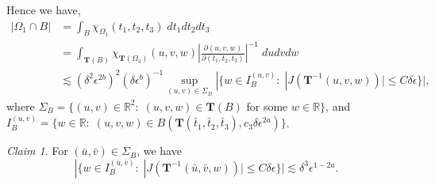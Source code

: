 \documentclass[a4paper,reqno]{amsart}
\theoremstyle{definition}
\theoremstyle{remark}
\newtheorem{claim}[theorem]{Claim}
\numberwithin{equation}{section}
\newcommand{\R}{{\mathbb {R}}}
\begin{document}
	Hence we have,
	\begin{align}
		\nonumber|\Omega_1\cap B|&=\int_B\chi_{\Omega_1}(t_1,t_2,t_3)\;dt_1dt_2dt_3\\
		\nonumber&=\int_{\boldsymbol{T}(B)}\chi_{\boldsymbol{T}(\Omega_3)}(u,v,w)\left|\frac{\partial (u,v,w)}{\partial(t_1,t_2,t_3)}\right|^{-1}\;dudvdw\\
		&\lesssim(\delta^2\epsilon^{2b})^2(\delta\epsilon^b)^{-1}\sup\limits_{(u,v)\in\Sigma_B}|\{w\in I_B^{(u,v)}:\;|J(\boldsymbol{T}^{-1}(u,v,w))|\leq C\delta\epsilon\}|,\label{intemediate3}
	\end{align}
	where $\Sigma_B=\{(u,v)\in\R^2:\;(u,v,w)\in\boldsymbol{T}(B)$ for some $w\in\R\}$, and $I_B^{(u,v)}=\{w\in\R:\;(u,v,w)\in B(\boldsymbol{T}(\bar t_1,\bar t_2,\bar t_3),c_3\delta\epsilon^{2a})\}$.
	\begin{claim}\label{claim:sublevel}
		For $(\bar u,\bar v)\in\Sigma_B$, we have
		\begin{equation*}
			|\{w\in I_B^{(\bar u,\bar v)}:\;|J(\boldsymbol{T}^{-1}(\bar u,\bar v,w))|\leq C\delta\epsilon\}|\lesssim\delta^3\epsilon^{1-2a}.
		\end{equation*}
	\end{claim}
\end{document}
